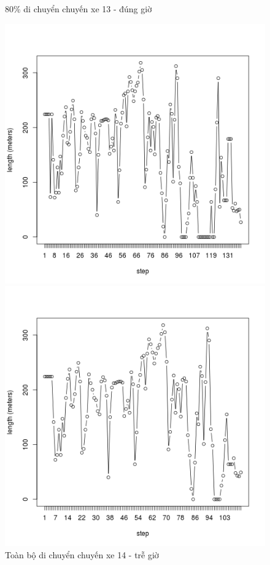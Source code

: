 \documentclass[a4paper, 13pt]{report}
\begin{document}
\begin{figure}[!htb]
  \caption*{80\% di chuyển chuyến xe 13 - đúng giờ}
\endminipage
{}%
  \includegraphics[width=\linewidth]{test_100_14}
  \caption*{Toàn bộ di chuyển chuyến xe 14 - trễ giờ}
\endminipage
{}
  \includegraphics[width=\linewidth]{test_80_14}

\end{figure}
\end{document}

